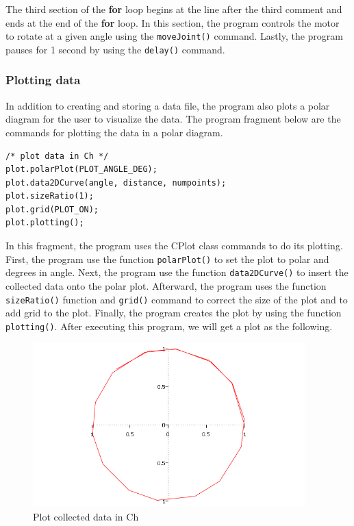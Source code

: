 \documentclass[11pt]{article}
\begin{document}
The third section of the {\bf for} loop begins at the line after the third comment 
and ends at the end of the {\bf for} loop. In this section, the program controls 
the motor to rotate at a given angle using the {\tt moveJoint()} command. Lastly, 
the program pauses for 1 second by using the {\tt delay()} command.

\subsubsection*{Plotting data}
In addition to creating and storing a data file, the program also plots a polar 
diagram for the user to visualize the data. The program fragment below are the 
commands for plotting the data in a polar diagram.
\begin{lstlisting}
/* plot data in Ch */
plot.polarPlot(PLOT_ANGLE_DEG);
plot.data2DCurve(angle, distance, numpoints);
plot.sizeRatio(1);
plot.grid(PLOT_ON); 
plot.plotting();
\end{lstlisting}
In this fragment, the program uses the CPlot class commands to do its plotting.
First, the program use the function {\tt polarPlot()} to set the plot to polar 
and degrees in angle. Next, the program use the function {\tt data2DCurve()} to 
insert the collected data onto the polar plot. Afterward, the program uses the 
function {\tt sizeRatio()} function and {\tt grid()} command to correct the size 
of the plot and to add grid to the plot. Finally, the program creates the plot 
by using the function {\tt plotting()}. After executing this program, we will get
a plot as the following.
\begin{figure}[h!]
    \begin{center}
    \includegraphics[height=2.5in]{figure/mindstorm/plotData.png}
    \caption{Plot collected data in Ch\label{fig_plot_data}}
\end{center}
\end{figure}
\end{document}
